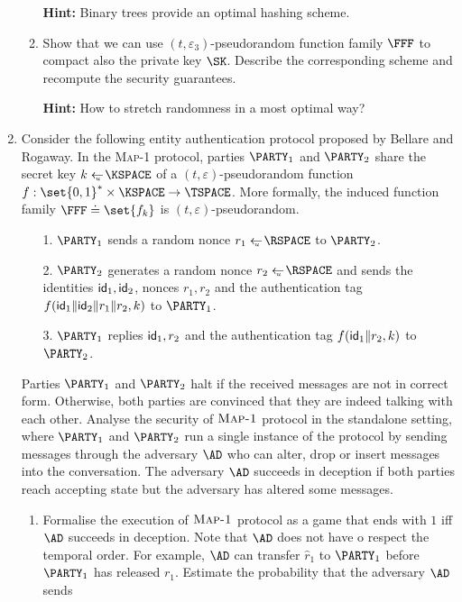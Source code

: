 \documentclass{article}
\begin{document}
\begin{enumerate}
\begin{enumerate}
   \textbf{Hint:} Binary trees provide an optimal hashing scheme.
 
 \item Show that we can use $(t,\varepsilon_3)$-pseudorandom function
   family $\FFF$ to compact also the private key $\SK$. Describe the
   corresponding scheme and recompute the security guarantees.
   
   \textbf{Hint:} How to stretch randomness in a most optimal way?
   \end{enumerate}

 \item Consider the following entity authentication protocol proposed
   by Bellare and Rogaway. In the \textsc{Map-1} protocol, parties
   $\PARTY_1$ and $\PARTY_2$ share the secret key $k\getsu\KSPACE$ of
   a $(t,\varepsilon)$-pseudorandom function
   $f:\set{0,1}^*\times\KSPACE\to\TSPACE$. More formally, the induced
   function family $\FFF\doteq\set{f_k}$ is
   $(t,\varepsilon)$-pseudorandom.
  \begin{enumerate}
  \item[1.] $\PARTY_1$ sends a random nonce $r_1\getsu\RSPACE$ to $\PARTY_2$.
  \item[2.] $\PARTY_2$ generates a random nonce $r_2\getsu\RSPACE$ and
    sends the identities $\mathsf{id}_1,\mathsf{id}_2$, nonces $r_1,r_2$ and the
    authentication tag $f(\mathsf{id}_1\|\mathsf{id}_2\|r_1\|r_2,k)$ to $\PARTY_1$.
  \item[3.] $\PARTY_1$ replies $\mathsf{id}_1,r_2$ and the authentication tag
    $f(\mathsf{id}_1\|r_2,k)$ to $\PARTY_2$.
  \end{enumerate}
  Parties $\PARTY_1$ and $\PARTY_2$ halt if the received messages are
  not in correct form. Otherwise, both parties are convinced that they
  are indeed talking with each other. Analyse the security of
  $\textsc{Map-1}$ protocol in the standalone setting, where
  $\PARTY_1$ and $\PARTY_2$ run a single instance of the protocol by
  sending messages through the adversary $\AD$ who can alter, drop or
  insert messages into the conversation. The adversary $\AD$ succeeds
  in deception if both parties reach accepting state but the adversary
  has altered some messages.
  \begin{enumerate}
  \item Formalise the execution of $\textsc{Map-1}$ protocol as a game
    that ends with $1$ iff $\AD$ succeeds in deception. Note that
    $\AD$ does not have o respect the temporal order. For example,
    $\AD$ can transfer $\hat{r}_1$ to $\PARTY_1$ before $\PARTY_1$ has
    released $r_1$.
    Estimate the probability that the adversary $\AD$ sends

\end{enumerate}
\end{enumerate}
\end{document}
